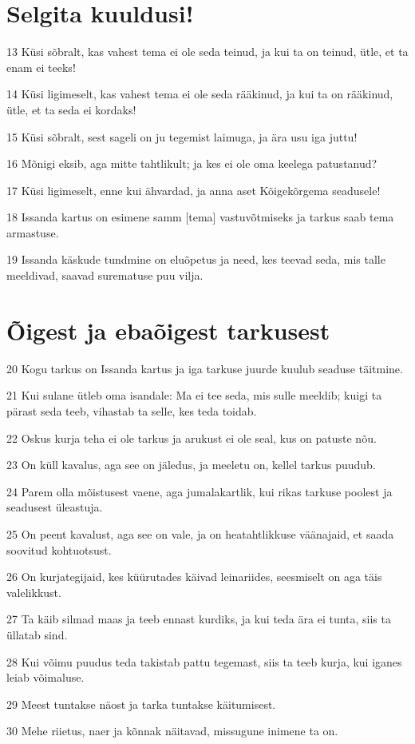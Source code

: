 \section*{Selgita kuuldusi!}

\par 13 Küsi sõbralt, kas vahest tema ei ole seda teinud, ja kui ta on teinud, ütle, et ta enam ei teeks!
\par 14 Küsi ligimeselt, kas vahest tema ei ole seda rääkinud, ja kui ta on rääkinud, ütle, et ta seda ei kordaks!
\par 15 Küsi sõbralt, sest sageli on ju tegemist laimuga, ja ära usu iga juttu!
\par 16 Mõnigi eksib, aga mitte tahtlikult; ja kes ei ole oma keelega patustanud?
\par 17 Küsi ligimeselt, enne kui ähvardad, ja anna aset Kõigekõrgema seadusele!
\par 18 Issanda kartus on esimene samm [tema] vastuvõtmiseks ja tarkus saab tema armastuse.
\par 19 Issanda käskude tundmine on eluõpetus ja need, kes teevad seda, mis talle meeldivad, saavad surematuse puu vilja.

\section*{Õigest ja ebaõigest tarkusest}

\par 20 Kogu tarkus on Issanda kartus ja iga tarkuse juurde kuulub seaduse täitmine.
\par 21 Kui sulane ütleb oma isandale: Ma ei tee seda, mis sulle meeldib; kuigi ta pärast seda teeb, vihastab ta selle, kes teda toidab.
\par 22 Oskus kurja teha ei ole tarkus ja arukust ei ole seal, kus on patuste nõu.
\par 23 On küll kavalus, aga see on jäledus, ja meeletu on, kellel tarkus puudub.
\par 24 Parem olla mõistusest vaene, aga jumalakartlik, kui rikas tarkuse poolest ja seadusest üleastuja.
\par 25 On peent kavalust, aga see on vale, ja on heatahtlikkuse väänajaid, et saada soovitud kohtuotsust.
\par 26 On kurjategijaid, kes küürutades käivad leinariides, seesmiselt on aga täis valelikkust.
\par 27 Ta käib silmad maas ja teeb ennast kurdiks, ja kui teda ära ei tunta, siis ta üllatab sind.
\par 28 Kui võimu puudus teda takistab pattu tegemast, siis ta teeb kurja, kui iganes leiab võimaluse.
\par 29 Meest tuntakse näost ja tarka tuntakse käitumisest.
\par 30 Mehe riietus, naer ja kõnnak näitavad, missugune inimene ta on.

